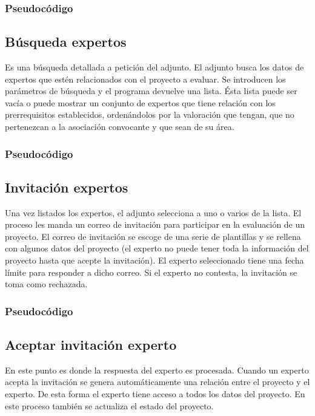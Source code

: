 \documentclass[12pt,a4paper,titlepage,spanish,twoside]{book}
\begin{document}
\subsubsection{Pseudocódigo}


\subsection{Búsqueda expertos}
Es una búsqueda detallada a petición del adjunto. El adjunto busca los datos de 
expertos que estén relacionados con el proyecto a evaluar. Se introducen los 
parámetros de búsqueda y el programa devuelve una lista. Ésta lista puede ser 
vacía o puede mostrar un conjunto de expertos que tiene relación con los 
prerrequisitos establecidos, ordenándolos por la valoración que tengan, que no 
pertenezcan a la asociación convocante y que sean de su área.

\subsubsection{Pseudocódigo}


\subsection{Invitación expertos}
Una vez listados los expertos, el adjunto selecciona a uno o varios 
de la lista. El proceso les manda un correo de invitación para participar en la 
evaluación de un proyecto. El correo de invitación se escoge de una serie de 
plantillas y se rellena con algunos datos del proyecto (el experto no puede 
tener toda la información del proyecto hasta que acepte la invitación). El 
experto seleccionado tiene una fecha límite para responder a dicho correo. Si el
experto no contesta, la invitación se toma como rechazada.

\subsubsection{Pseudocódigo}


\subsection{Aceptar invitación experto}
En este punto es donde la respuesta del experto es procesada. Cuando un experto 
acepta la invitación se genera automáticamente una relación entre el proyecto y 
el experto. De esta forma el experto tiene acceso a todos los datos del 
proyecto. En este proceso también se actualiza el estado del proyecto.
\end{document}
